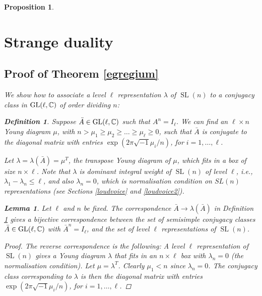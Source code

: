 \documentclass[11pt]{amsart}
\newcommand\op{\operatorname}
\newtheorem{proposition}[theorem]{Proposition}
\newtheorem{lemma}[theorem]{Lemma}
\newtheorem{defi}[theorem]{Definition}
\numberwithin{theorem}{subsection}
\begin{document}
{\begin{proposition}
\section{Strange duality}\label{SD}
\subsection{Proof of Theorem \ref{egregium}}
 We show how to  associate a level $\ell$ representation $\lambda$ of $\op{SL}(n)$ to  a conjugacy class in $\op{GL}(\ell,\Bbb{C})$ of order dividing $n$:
\begin{defi} \label{reprem2}
Suppose $\bar{A}\in \op{GL}(\ell,\Bbb{C})$ such that  $A^n=I_{\ell}$.   We can find an $\ell\times n$ Young diagram $\mu$, with $n> \mu_1\geq \mu_2\geq \dots \geq \mu_{\ell}\geq 0$, such that $\bar{A}$ is conjugate to the diagonal matrix with entries $\exp(2\pi\sqrt{-1}\mu_i/n)$, for $i=1,\dots,\ell$.

  Let $\lambda=\lambda(\bar{A})=\mu^T$, the transpose Young diagram of $\mu$, which fits in a box of size $n\times \ell$. Note that $\lambda$ is dominant integral weight of $\op{SL}(n)$ of level $\ell$, i.e., $\lambda_1-\lambda_n \leq \ell$, and also  $\lambda_n=0$, which is  normalisation condition on $SL(n)$ representations (see Sections \ref{loudvoice} and \ref{loudvoice2}).
\end{defi}


\begin{lemma}\label{reprem}Let $\ell$ and $n$ be fixed. The correspondence $\bar{A}\to \lambda(\bar{A})$ in Definition \ref{reprem2} gives a bijective correspondence between the  set of semisimple conjugacy classes  $\bar{A}\in\op{GL}(\ell,\Bbb{C})$ with $\bar{A}^n=I_{\ell}$,  and the set of  level $\ell$ representations of $\op{SL}(n)$.
\end{lemma}
\begin{proof}
The reverse correspondence is the following: A  level $\ell$ representation of $\op{SL}(n)$
gives a Young diagram  $\lambda$ that fits in an $n\times \ell$ box with $\lambda_n=0$ (the  normalisation condition).   Let $\mu=\lambda^T$.  Clearly $\mu_1<n$ since $\lambda_n=0$. The conjugacy class corresponding to $\lambda$ is then the diagonal matrix with entries $\exp(2\pi\sqrt{-1}\mu_i/n)$, for $i=1,\dots,\ell$.
\end{proof}



\end{proposition}}
\end{document}
